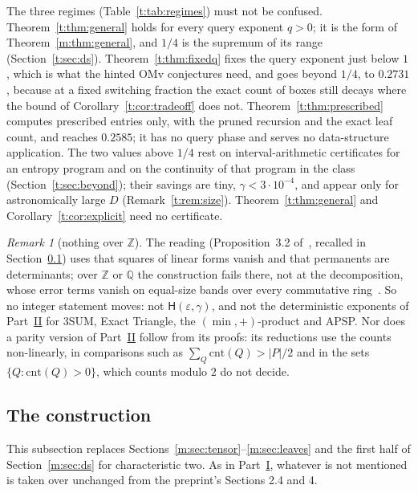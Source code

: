 \documentclass[11pt]{article}
\theoremstyle{definition}
\theoremstyle{remark}
\newtheorem{remark}[theorem]{Remark}
\newcommand{\Z}{\mathbb{Z}}
\newcommand{\Q}{\mathbb{Q}}
\newcommand{\cnt}{\mathrm{cnt}}
\newcommand{\Hyp}{\mathsf{H}}
\newcommand{\HintedOMvMcOurs}{0.2731}%
\newcommand{\CharTwoPrescribed}{0.2585}%
\begin{document}
The three regimes (Table~\ref{t:tab:regimes}) must not be confused. Theorem~\ref{t:thm:general} holds for every query exponent $q>0$; it is the form of Theorem~\ref{m:thm:general}, and $1/4$ is the supremum of its range (Section~\ref{t:sec:ds}). Theorem~\ref{t:thm:fixedq} fixes the query exponent just below $1$, which is what the hinted OMv conjectures need, and goes beyond $1/4$, to $\HintedOMvMcOurs$, because at a fixed switching fraction the exact count of boxes still decays where the bound of Corollary~\ref{t:cor:tradeoff} does not. Theorem~\ref{t:thm:prescribed} computes prescribed entries only, with the pruned recursion and the exact leaf count, and reaches $\CharTwoPrescribed$; it has no query phase and serves no data-structure application. The two values above $1/4$ rest on interval-arithmetic certificates for an entropy program and on the continuity of that program in the class (Section~\ref{t:sec:beyond}); their savings are tiny, $\gamma<3\cdot10^{-4}$, and appear only for astronomically large $D$ (Remark~\ref{t:rem:size}). Theorem~\ref{t:thm:general} and Corollary~\ref{t:cor:explicit} need no certificate.

\begin{remark}[nothing over $\Z$]\label{t:rem:notZ}
The reading (Proposition~3.2 of~\cite{Maj26b}, recalled in Section~\ref{t:sec:construction}) uses that squares of linear forms vanish and that permanents are determinants; over $\Z$ or $\Q$ the construction fails there, not at the decomposition, whose error terms vanish on equal-size bands over every commutative ring~\cite[Lemma~3.1]{Maj26b}. So no integer statement moves: not $\Hyp(\varepsilon,\gamma)$, and not the deterministic exponents of Part~\hyperref[m:partII]{II} for 3SUM, Exact Triangle, the $(\min,+)$-product and APSP. Nor does a parity version of Part~\hyperref[m:partII]{II} follow from its proofs: its reductions use the counts non-linearly, in comparisons such as $\sum_Q\cnt(Q)>|P|/2$ and in the sets $\{Q:\cnt(Q)>0\}$, which counts modulo $2$ do not decide.
\end{remark}

\subsection{The construction}\label{t:sec:construction}

This subsection replaces Sections~\ref{m:sec:tensor}--\ref{m:sec:leaves} and the first half of Section~\ref{m:sec:ds} for characteristic two. As in Part~\hyperref[m:partI]{I}, whatever is not mentioned is taken over unchanged from the preprint's Sections 2.4 and 4.
\end{document}
